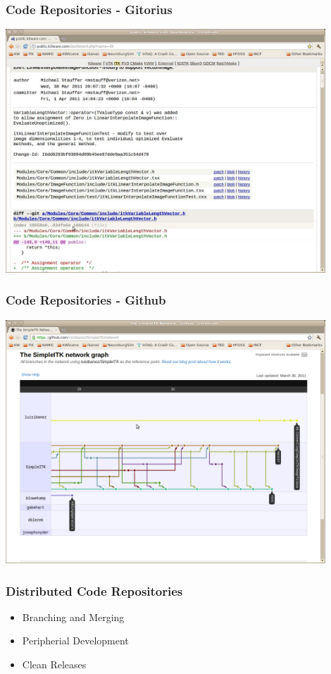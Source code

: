 \documentclass[18pt]{beamer}
\begin{document}
\begin{frame}
\frametitle{Code Repositories - Gitorius}
\includegraphics[width=0.9\textwidth,height=0.9\paperheight]{../Art/ITKGitScreenShot.jpg}
\end{frame}


\begin{frame}
\frametitle{Code Repositories - Github}
\includegraphics[width=0.9\textwidth,height=0.9\paperheight]{../Art/SimpleITKGithubScreenShot.jpg}
\end{frame}


\begin{frame}
\frametitle{Distributed Code Repositories}
\Huge
\begin{itemize}
\item Branching and Merging
\pause
\item Peripherial Development
\pause
\item Clean Releases
\end{itemize}
\end{frame}
\end{document}

